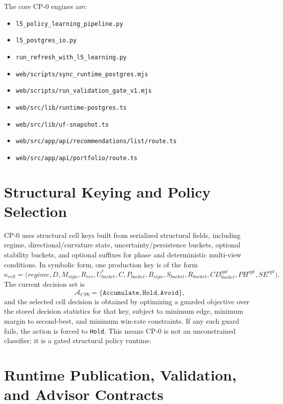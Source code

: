 The core CP-0 engines are:
\begin{itemize}
    \item \texttt{l5\_policy\_learning\_pipeline.py}
    \item \texttt{l5\_postgres\_io.py}
    \item \texttt{run\_refresh\_with\_l5\_learning.py}
    \item \texttt{web/scripts/sync\_runtime\_postgres.mjs}
    \item \texttt{web/scripts/run\_validation\_gate\_v1.mjs}
    \item \texttt{web/src/lib/runtime-postgres.ts}
    \item \texttt{web/src/lib/uf-snapshot.ts}
    \item \texttt{web/src/app/api/recommendations/list/route.ts}
    \item \texttt{web/src/app/api/portfolio/route.ts}
\end{itemize}

\section{Structural Keying and Policy Selection}

CP-0 uses structural cell keys built from serialized structural fields, including regime, directional/curvature state, uncertainty/persistence buckets, optional stability buckets, and optional suffixes for phase and deterministic multi-view conditions. In symbolic form, one production key is of the form
\[
\kappa_{cell}=\big(regime, D, M_{sign}, R_{rev}, U^{\ast}_{bucket}, C, P_{bucket}, B_{sign}, S_{bucket}, R_{bucket}, CD_{bucket}^{opt}, PH^{opt}, SE^{opt}\big).
\]
The current decision set is
\[
\mathcal{A}_{CP0}=\{\texttt{Accumulate},\texttt{Hold},\texttt{Avoid}\},
\]
and the selected cell decision is obtained by optimizing a guarded objective over the stored decision statistics for that key, subject to minimum edge, minimum margin to second-best, and minimum win-rate constraints. If any such guard fails, the action is forced to \texttt{Hold}. This means CP-0 is not an unconstrained classifier; it is a gated structural policy runtime.

\section{Runtime Publication, Validation, and Advisor Contracts}

